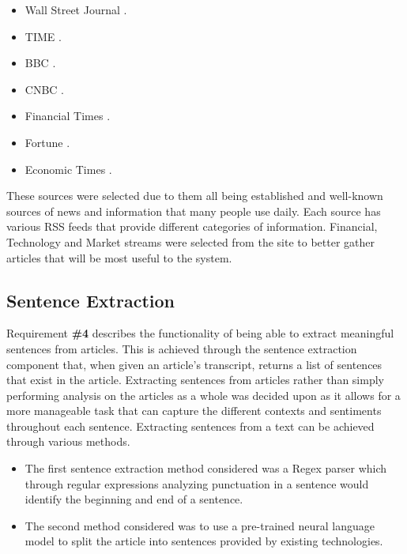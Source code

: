         \begin{multicols}{2}
        \begin{itemize}
            \item Wall Street Journal \citep{source:WSJ}.
            \item TIME \citep{source:TIME}.
            \item BBC \citep{source:BBC}.
            \item CNBC \citep{source:CNBC}.
            \item Financial Times \citep{source:FinancialTimes}.
            \item Fortune \citep{source:Fortune}.
            \item Economic Times \citep{source:EconomicTimes}.
        \end{itemize}
        \end{multicols}
        
        These sources were selected due to them all being established and well-known sources of news and information that many people use daily. Each source has various RSS feeds that provide different categories of information. Financial, Technology and Market streams were selected from the site to better gather articles that will be most useful to the system.
        
        \subsection{Sentence Extraction}
        \label{des:sentence}
        Requirement \textbf{\#4} describes the functionality of being able to extract meaningful sentences from articles. This is achieved through the sentence extraction component that, when given an article's transcript, returns a list of sentences that exist in the article. Extracting sentences from articles rather than simply performing analysis on the articles as a whole was decided upon as it allows for a more manageable task that can capture the different contexts and sentiments throughout each sentence. Extracting sentences from a text can be achieved through various methods. 
        
        \begin{itemize}
            \item The first sentence extraction method considered was a Regex parser which through regular expressions analyzing punctuation in a sentence would identify the beginning and end of a sentence.
            \item The second method considered was to use a pre-trained neural language model to split the article into sentences provided by existing technologies.
        \end{itemize}
        
